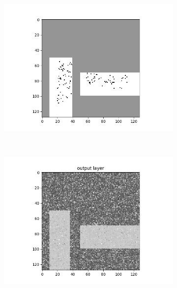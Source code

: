 \begin{figure}[h] %
\centering
\begin{subfigure}[t]{0.45\textwidth}
\centering
\includegraphics[width=\textwidth]{Figs/zeros.png}
\caption{} 
\label{fig:zeros} 
\end{subfigure}
~
\begin{subfigure}[t]{0.45\textwidth}
\includegraphics[width=\textwidth]{Figs/final_output0.png}
\caption{} 
\label{fig:final_output0}
\end{subfigure}
\end{figure}

